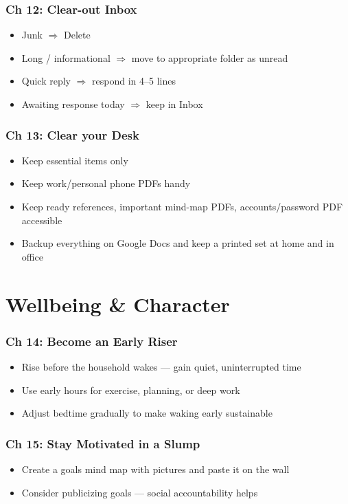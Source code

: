 \begin{frame}[fragile]
\frametitle{Ch 12: Clear-out Inbox}
\begin{itemize}
\item Junk $\Rightarrow$ Delete
\item Long / informational $\Rightarrow$ move to appropriate folder as unread
\item Quick reply $\Rightarrow$ respond in 4--5 lines
\item Awaiting response today $\Rightarrow$ keep in Inbox
\end{itemize}
\end{frame}

\begin{frame}[fragile]
\frametitle{Ch 13: Clear your Desk}
\begin{itemize}
\item Keep essential items only
\item Keep work/personal phone PDFs handy
\item Keep ready references, important mind-map PDFs, accounts/password PDF accessible
\item Backup everything on Google Docs and keep a printed set at home and in office
\end{itemize}
\end{frame}

\section{Wellbeing \& Character}

\begin{frame}[fragile]
\frametitle{Ch 14: Become an Early Riser}
\begin{itemize}
\item Rise before the household wakes --- gain quiet, uninterrupted time
\item Use early hours for exercise, planning, or deep work
\item Adjust bedtime gradually to make waking early sustainable
\end{itemize}
\end{frame}

\begin{frame}[fragile]
\frametitle{Ch 15: Stay Motivated in a Slump}
\begin{itemize}
\item Create a goals mind map with pictures and paste it on the wall
\item Consider publicizing goals --- social accountability helps
\end{itemize}
\end{frame}

